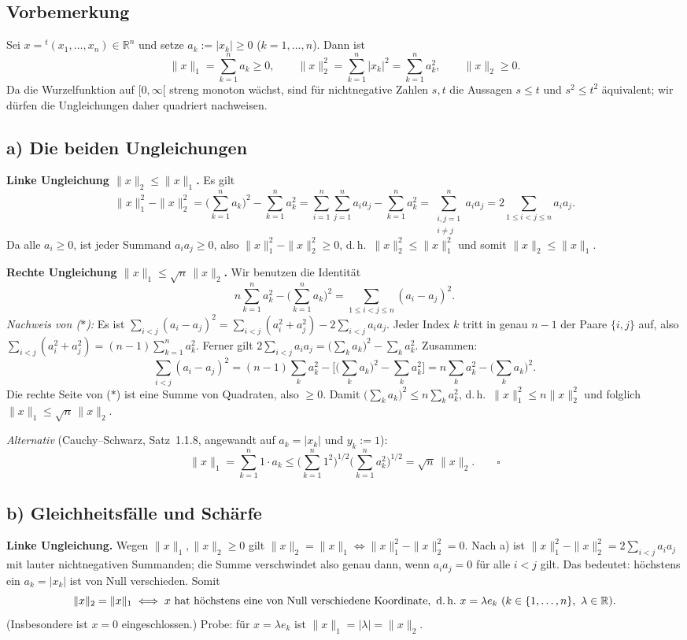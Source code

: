 \documentclass[a4paper,11pt]{article}
\begin{document}
\subsection*{Vorbemerkung}
Sei $x={}^t(x_1,\dots,x_n)\in\mathbb{R}^n$ und setze $a_k:=|x_k|\ge 0$ ($k=1,\dots,n$). Dann ist
\[
\|x\|_1=\sum_{k=1}^n a_k\ge 0,\qquad \|x\|_2^2=\sum_{k=1}^n |x_k|^2=\sum_{k=1}^n a_k^2,\qquad \|x\|_2\ge 0 .
\]
Da die Wurzelfunktion auf $[0,\infty[$ streng monoton wächst, sind für nichtnegative Zahlen $s,t$ die Aussagen $s\le t$ und $s^2\le t^2$ äquivalent; wir dürfen die Ungleichungen daher quadriert nachweisen.

\subsection*{a) Die beiden Ungleichungen}
\textbf{Linke Ungleichung $\|x\|_2\le\|x\|_1$.} Es gilt
\[
\|x\|_1^2-\|x\|_2^2=\Big(\sum_{k=1}^n a_k\Big)^2-\sum_{k=1}^n a_k^2
=\sum_{i=1}^n\sum_{j=1}^n a_i a_j-\sum_{k=1}^n a_k^2
=\sum_{\substack{i,j=1\\ i\ne j}}^n a_i a_j
=2\!\!\sum_{1\le i<j\le n}\!\! a_i a_j .
\]
Da alle $a_i\ge 0$, ist jeder Summand $a_i a_j\ge 0$, also $\|x\|_1^2-\|x\|_2^2\ge 0$, d.\,h.\ $\|x\|_2^2\le\|x\|_1^2$ und somit $\|x\|_2\le\|x\|_1$.

\textbf{Rechte Ungleichung $\|x\|_1\le\sqrt{n}\,\|x\|_2$.} Wir benutzen die Identität
\[
n\sum_{k=1}^n a_k^2-\Big(\sum_{k=1}^n a_k\Big)^2=\sum_{1\le i<j\le n}(a_i-a_j)^2. \tag{$\ast$}
\]
\emph{Nachweis von ($\ast$):} Es ist $\displaystyle\sum_{i<j}(a_i-a_j)^2=\sum_{i<j}(a_i^2+a_j^2)-2\sum_{i<j}a_i a_j$. Jeder Index $k$ tritt in genau $n-1$ der Paare $\{i,j\}$ auf, also $\sum_{i<j}(a_i^2+a_j^2)=(n-1)\sum_{k=1}^n a_k^2$. Ferner gilt $2\sum_{i<j}a_i a_j=\big(\sum_k a_k\big)^2-\sum_k a_k^2$. Zusammen:
\[
\sum_{i<j}(a_i-a_j)^2=(n-1)\sum_k a_k^2-\Big[\big(\textstyle\sum_k a_k\big)^2-\sum_k a_k^2\Big]=n\sum_k a_k^2-\big(\textstyle\sum_k a_k\big)^2 .
\]
Die rechte Seite von ($\ast$) ist eine Summe von Quadraten, also $\ge 0$. Damit $\big(\sum_k a_k\big)^2\le n\sum_k a_k^2$, d.\,h.\ $\|x\|_1^2\le n\|x\|_2^2$ und folglich $\|x\|_1\le\sqrt{n}\,\|x\|_2$.

\emph{Alternativ} (Cauchy--Schwarz, Satz~1.1.8, angewandt auf $a_k=|x_k|$ und $y_k:=1$):
\[
\|x\|_1=\sum_{k=1}^n 1\cdot a_k\le\Big(\sum_{k=1}^n 1^2\Big)^{1/2}\Big(\sum_{k=1}^n a_k^2\Big)^{1/2}=\sqrt{n}\,\|x\|_2 . \qquad\square
\]

\subsection*{b) Gleichheitsfälle und Schärfe}
\textbf{Linke Ungleichung.} Wegen $\|x\|_1,\|x\|_2\ge 0$ gilt $\|x\|_2=\|x\|_1\iff\|x\|_1^2-\|x\|_2^2=0$. Nach a) ist $\|x\|_1^2-\|x\|_2^2=2\sum_{i<j}a_i a_j$ mit lauter nichtnegativen Summanden; die Summe verschwindet also genau dann, wenn $a_i a_j=0$ für alle $i<j$ gilt. Das bedeutet: höchstens ein $a_k=|x_k|$ ist von Null verschieden. Somit
\[
\|x\|_2=\|x\|_1\iff x \text{ hat höchstens eine von Null verschiedene Koordinate},\ \text{d.\,h.\ } x=\lambda e_k\ (k\in\{1,\dots,n\},\ \lambda\in\mathbb{R}).
\]
(Insbesondere ist $x=0$ eingeschlossen.) Probe: für $x=\lambda e_k$ ist $\|x\|_1=|\lambda|=\|x\|_2$.
\end{document}
